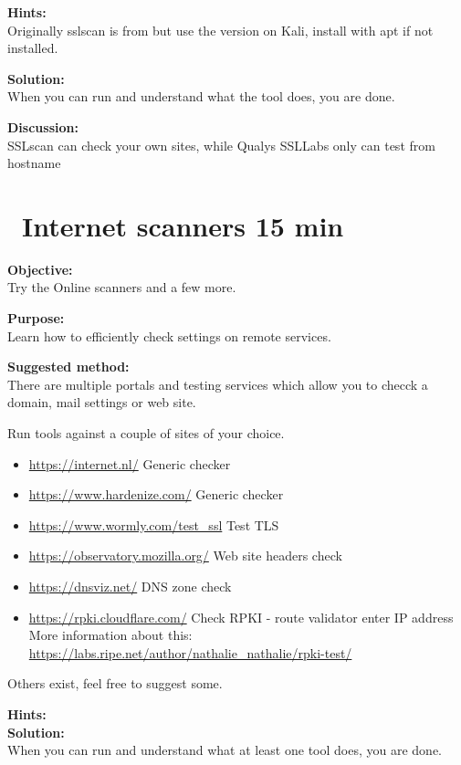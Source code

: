 \documentclass[a4paper,11pt,notitlepage]{report}
\begin{document}
{\bf Hints:}\\
Originally sslscan is from  but use the version on Kali, install with apt if not installed.

{\bf Solution:}\\
When you can run and understand what the tool does, you are done.

{\bf Discussion:}\\
SSLscan can check your own sites, while Qualys SSLLabs only can test from hostname


\chapter{\faInfoCircle\ Internet scanners 15 min}
\label{ex:web-site-check}

{\bf Objective:}\\
Try the Online scanners  and a few more.

{\bf Purpose:}\\
Learn how to efficiently check settings on remote services.

{\bf Suggested method:}\\
There are multiple portals and testing services which allow you to checck a domain,
mail settings or web site.

Run tools against a couple of sites of your choice.
\begin{itemize}
\item \url{https://internet.nl/} Generic checker
\item \url{https://www.hardenize.com/} Generic checker
\item \url{https://www.wormly.com/test_ssl} Test TLS
\item \url{https://observatory.mozilla.org/} Web site headers check
\item \url{https://dnsviz.net/} DNS zone check
\item \url{https://rpki.cloudflare.com/} Check RPKI - route validator enter
IP address\\
More information about this: \url{https://labs.ripe.net/author/nathalie_nathalie/rpki-test/}
\end{itemize}

Others exist, feel free to suggest some.

{\bf Hints:}\\

{\bf Solution:}\\
When you can run and understand what at least one tool does, you are done.
\end{document}
